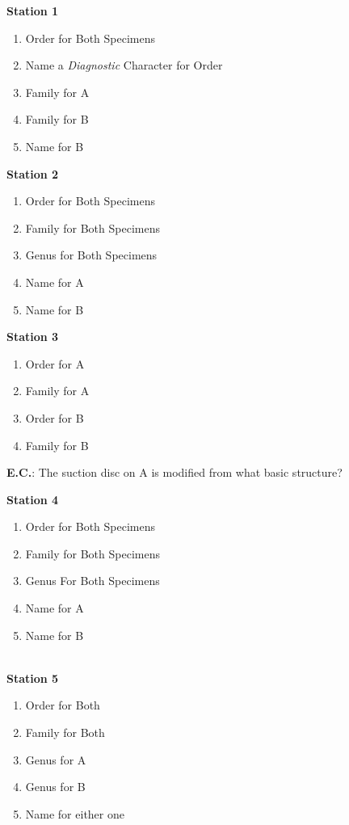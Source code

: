\textbf{Station 1}

\begin{enumerate}
\def\labelenumi{\arabic{enumi}.}
\item
  Order for Both Specimens
\item
  Name a \emph{Diagnostic} Character for Order
\item
  Family for A
\item
  Family for B
\item
  Name for B
\end{enumerate}

\textbf{Station 2}

\begin{enumerate}
\def\labelenumi{\arabic{enumi}.}
\setcounter{enumi}{5}
\item
  Order for Both Specimens
\item
  Family for Both Specimens
\item
  Genus for Both Specimens
\item
  Name for A
\item
  Name for B
\end{enumerate}

\textbf{Station 3}

\begin{enumerate}
\def\labelenumi{\arabic{enumi}.}
\setcounter{enumi}{10}
\item
  Order for A
\item
  Family for A
\item
  Order for B
\item
  Family for B
\end{enumerate}

\textbf{E.C.}: The suction disc on A is modified from what basic
structure?

\textbf{Station 4}

\begin{enumerate}
\def\labelenumi{\arabic{enumi}.}
\setcounter{enumi}{14}
\item
  Order for Both Specimens
\item
  Family for Both Specimens
\item
  Genus For Both Specimens
\item
  Name for A
\item
  Name for B
\end{enumerate}

\textbf{\\
Station 5}

\begin{enumerate}
\def\labelenumi{\arabic{enumi}.}
\setcounter{enumi}{19}
\item
  Order for Both
\item
  Family for Both
\item
  Genus for A
\item
  Genus for B
\item
  Name for either one
\end{enumerate}

